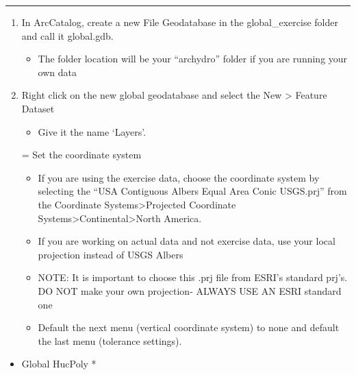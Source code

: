 \documentclass[letterpaper,10pt,english]{sphinxmanual}
\begin{document}
\bigskip\hrule\bigskip

\begin{enumerate}
\def\theenumi{\arabic{enumi}}
\def\labelenumi{\theenumi .}
\makeatletter\def\p@enumii{\p@enumi \theenumi .}\makeatother
\item {} 
In ArcCatalog, create a new File Geodatabase in the global\_exercise folder and call it global.gdb.
\begin{itemize}
\item {} 
The folder location will be your “archydro” folder if you are running your own data

\end{itemize}

\item {} 
Right click on the new global geodatabase and select the New \textgreater{} Feature Dataset
\begin{itemize}
\item {} 
Give it the name ‘Layers’.

\end{itemize}

= Set the coordinate system
\begin{itemize}
\item {} 
If you are using the exercise data, choose the coordinate system by selecting the “USA Contiguous Albers Equal Area Conic USGS.prj” from the Coordinate Systems\textgreater{}Projected Coordinate Systems\textgreater{}Continental\textgreater{}North America.

\item {} 
If you are working on actual data and not exercise data, use your local projection instead of USGS Albers

\item {} 
NOTE: It is important to choose this .prj file from ESRI’s standard prj’s. DO NOT make your own projection- ALWAYS USE AN ESRI standard one

\end{itemize}
\begin{itemize}
\item {} 
Default the next menu (vertical coordinate system) to none and default the last menu (tolerance settings).

\end{itemize}

\end{enumerate}
\begin{itemize}
\item {} 
Global HucPoly *

\end{itemize}
\end{document}
